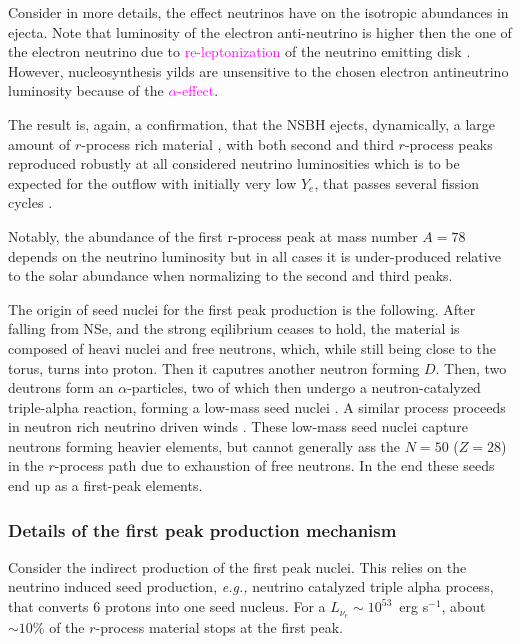 \documentclass[11pt,a4paper,headinclude=true,DIV=14,BCOR=8mm,chapterprefix,listof=totoc,twoside,openright,abstracton]{scrbook}
\newcommand{\magenta}[1]{\textcolor{magenta}{#1}} %
\begin{document}
Consider in more details, the effect neutrinos have on the isotropic abundances in ejecta. 
Note that luminosity of the electron anti-neutrino is higher then the one of the electron neutrino due to \magenta{re-leptonization} of the neutrino emitting disk \cite{Foucart et al., 2016a}. However, nucleosynthesis yilds are unsensitive to the chosen electron antineutrino luminosity because of the \magenta{$\alpha$-effect}.

The result is, again, a confirmation, that the NSBH ejects, dynamically, a large amount of $r$-process rich material \cite{(e.g. Roberts et al., 2011; Korobkin et al., 2012; Just et al., 2015)}, with both second and third $r$-process peaks reproduced robustly at all considered neutrino luminosities which is to be expected for the outflow with initially very low $Y_e$, that passes several fission cycles \cite{Lippuner and Roberts, 2015}. 

Notably, the abundance of the first r-process peak at mass number $A=78$ depends on the neutrino luminosity but in all cases it is under-produced relative to the solar abundance when normalizing to the second and third peaks.

The origin of seed nuclei for the first peak production is the following. After falling from NSe, and the strong eqilibrium ceases to hold, the material is composed of heavi nuclei and free neutrons, which, while still being close to the torus, turns into proton. Then it caputres another neutron forming $D$. Then, two deutrons form an $\alpha$-particles, two of which then undergo a neutron-catalyzed triple-alpha reaction, forming a low-mass seed nuclei \cite{Meyer et al., 1998}. A similar process proceeds in neutron rich neutrino driven winds \cite{Delano and Cameron, 1971; Hoffman et al., 1997}.
These low-mass seed nuclei capture neutrons forming heavier elements, but cannot generally ass the $N=50$ ($Z=28$) in the $r$-process path due to exhaustion of free neutrons. In the end these seeds end up as a first-peak elements. 


\subsubsection{Details of the first peak production mechanism}

Consider the indirect production of the first peak nuclei. This relies on the neutrino induced seed production, \textit{e.g.,} neutrino catalyzed triple alpha process, that converts $6$ protons into one seed nucleus. For a $L_{\nu_e}\sim 10^{53}$~erg s$^{-1}$, about $\sim10\%$ of the $r$-process material stops at the first peak. 
\end{document}
